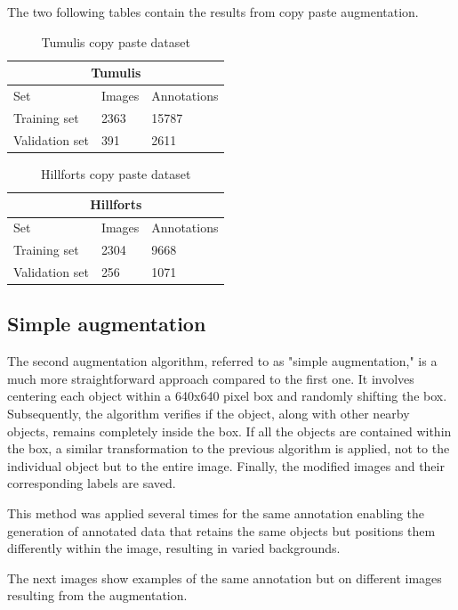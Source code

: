 The two following tables contain the results from copy paste augmentation.

\begin{table}[H]
\centering
\begin{tabular}{|p{3cm}|p{2.5cm}|p{2cm}|} 
\hline
\multicolumn{3}{|c|}{Tumulis} \\
 \hline
  Set & Images & Annotations\\ [0.5ex] 
 \hline
 Training set & 2363 & 15787 \\ 
 Validation set & 391 & 2611  \\[1ex]
 \hline
\end{tabular}
\caption{Tumulis copy paste dataset}
\end{table} 

\begin{table}[H]
\centering
\begin{tabular}{|p{3cm}|p{2.5cm}|p{2cm}|} 
\hline
\multicolumn{3}{|c|}{Hillforts} \\
 \hline
  Set & Images & Annotations\\ [0.5ex] 
 \hline
 Training set & 2304 & 9668 \\ 
 Validation set & 256 & 1071  \\[1ex]
 \hline
\end{tabular}
\caption{Hillforts copy paste dataset}
\end{table} 


\subsection{Simple augmentation}
The second augmentation algorithm, referred to as "simple augmentation," is a much more straightforward approach compared to the first one. It involves centering each object within a 640x640 pixel box and randomly shifting the box. Subsequently, the algorithm verifies if the object, along with other nearby objects, remains completely inside the box. If all the objects are contained within the box, a similar transformation to the previous algorithm is applied, not to the individual object but to the entire image. Finally, the modified images and their corresponding labels are saved.

This method was applied several times for the same annotation enabling the generation of annotated data that retains the same objects but positions them differently within the image, resulting in varied backgrounds.

The next images show examples of the same annotation but on different images resulting from the augmentation.


